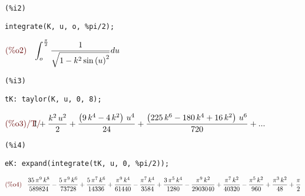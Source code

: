 \documentclass[12pt]{article}
\begin{document}
\noindent
\begin{minipage}[t]{8ex}{\color{red}\bf
\begin{verbatim}
(%i2) 
\end{verbatim}}
\end{minipage}
\begin{minipage}[t]{\textwidth}{\color{blue}
\begin{verbatim}
integrate(K, u, o, %pi/2);
\end{verbatim}}
\end{minipage}
\begin{math}\displaystyle
\parbox{8ex}{\color{labelcolor}(\%o2) }
\int_{o}^{\frac{\pi }{2}}\frac{1}{\sqrt{1-{k}^{2}\,{\mathrm{sin}\left( u\right) }^{2}}}du
\end{math}

\noindent
\begin{minipage}[t]{8ex}{\color{red}\bf
\begin{verbatim}
(%i3) 
\end{verbatim}}
\end{minipage}
\begin{minipage}[t]{\textwidth}{\color{blue}
\begin{verbatim}
tK: taylor(K, u, 0, 8);
\end{verbatim}}
\end{minipage}
\begin{math}\displaystyle
\parbox{8ex}{\color{labelcolor}(\%o3)/T/ }
1+\frac{{k}^{2}\,{u}^{2}}{2}+\frac{\left( 9\,{k}^{4}-4\,{k}^{2}\right) \,{u}^{4}}{24}+\frac{\left( 225\,{k}^{6}-180\,{k}^{4}+16\,{k}^{2}\right) \,{u}^{6}}{720}
+...
\end{math}

\noindent
\begin{minipage}[t]{8ex}{\color{red}\bf
\begin{verbatim}
(%i4) 
\end{verbatim}}
\end{minipage}
\begin{minipage}[t]{\textwidth}{\color{blue}
\begin{verbatim}
eK: expand(integrate(tK, u, 0, %pi/2));
\end{verbatim}}
\end{minipage}
\begin{math}\displaystyle
\parbox{8ex}{\color{labelcolor}(\%o4) }
\frac{35\,{\pi }^{9}\,{k}^{8}}{589824}-\frac{5\,{\pi }^{9}\,{k}^{6}}{73728}+\frac{5\,{\pi }^{7}\,{k}^{6}}{14336}+\frac{{\pi }^{9}\,{k}^{4}}{61440}-\frac{{\pi }^{7}\,{k}^{4}}{3584}+\frac{3\,{\pi }^{5}\,{k}^{4}}{1280}-\frac{{\pi }^{9}\,{k}^{2}}{2903040}+\frac{{\pi }^{7}\,{k}^{2}}{40320}-\frac{{\pi }^{5}\,{k}^{2}}{960}+\frac{{\pi }^{3}\,{k}^{2}}{48}+\frac{\pi }{2}
\end{math}
\end{document}
